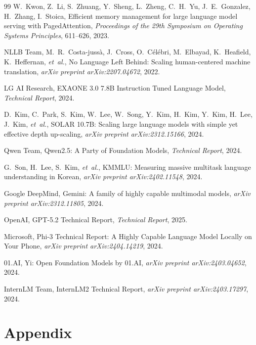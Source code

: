 \documentclass[AMS,STIX2COL]{WileyNJD-v2}
\begin{document}
\begin{thebibliography}{99}
W.~Kwon, Z.~Li, S.~Zhuang, Y.~Sheng, L.~Zheng, C.~H.~Yu, J.~E.~Gonzalez,
H.~Zhang, I.~Stoica,
Efficient memory management for large language model serving with PagedAttention,
\textit{Proceedings of the 29th Symposium on Operating Systems Principles},
611--626, 2023.

NLLB Team, M.~R.~Costa-juss\`{a}, J.~Cross, O.~C\'{e}l\'{e}bri, M.~Elbayad,
K.~Heafield, K.~Heffernan, \textit{et~al.},
No Language Left Behind: Scaling human-centered machine translation,
\textit{arXiv preprint arXiv:2207.04672}, 2022.

LG AI Research,
EXAONE 3.0 7.8B Instruction Tuned Language Model,
\textit{Technical Report}, 2024.

D.~Kim, C.~Park, S.~Kim, W.~Lee, W.~Song, Y.~Kim, H.~Kim, Y.~Kim, H.~Lee,
J.~Kim, \textit{et~al.},
SOLAR 10.7B: Scaling large language models with simple yet effective
depth up-scaling,
\textit{arXiv preprint arXiv:2312.15166}, 2024.

Qwen Team,
Qwen2.5: A Party of Foundation Models,
\textit{Technical Report}, 2024.

G.~Son, H.~Lee, S.~Kim, \textit{et~al.},
KMMLU: Measuring massive multitask language understanding in Korean,
\textit{arXiv preprint arXiv:2402.11548}, 2024.

Google DeepMind,
Gemini: A family of highly capable multimodal models,
\textit{arXiv preprint arXiv:2312.11805}, 2024.

OpenAI,
GPT-5.2 Technical Report,
\textit{Technical Report}, 2025.

Microsoft,
Phi-3 Technical Report: A Highly Capable Language Model Locally on Your Phone,
\textit{arXiv preprint arXiv:2404.14219}, 2024.

01.AI,
Yi: Open Foundation Models by 01.AI,
\textit{arXiv preprint arXiv:2403.04652}, 2024.

InternLM Team,
InternLM2 Technical Report,
\textit{arXiv preprint arXiv:2403.17297}, 2024.

\end{thebibliography}

\appendix
\section*{Appendix}
\end{document}

